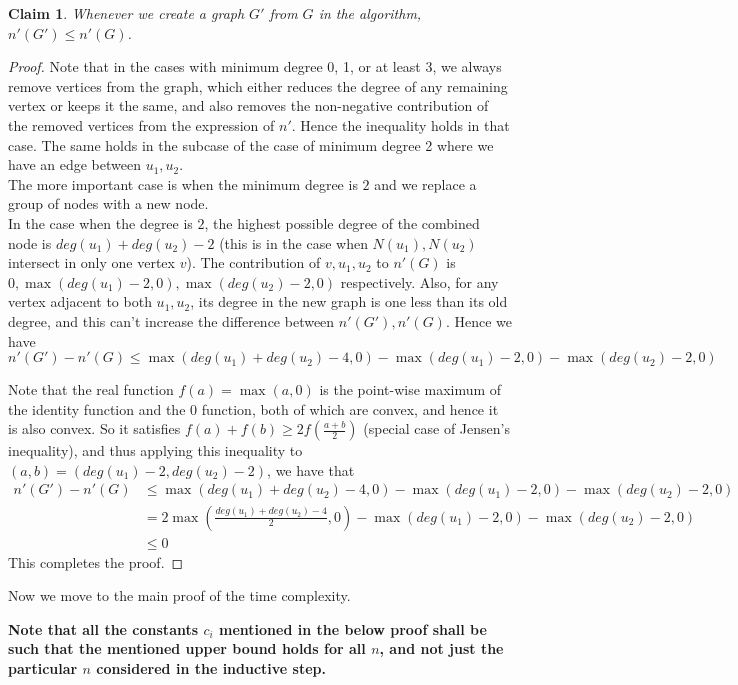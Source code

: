 \documentclass[answers]{exam}
\newtheorem{claim}{Claim}
\newcommand{\nl}{\vspace{0.2cm}\\}
\begin{document}
\begin{questions}
\begin{solution}
\begin{claim}
    Whenever we create a graph $G'$ from $G$ in the algorithm, $n'(G') \le n'(G)$.
\end{claim}
\begin{proof}
    Note that in the cases with minimum degree 0, 1, or at least 3, we always remove vertices from the graph, which either reduces the degree of any remaining vertex or keeps it the same, and also removes the non-negative contribution of the removed vertices from the expression of $n'$. Hence the inequality holds in that case. The same holds in the subcase of the case of minimum degree 2 where we have an edge between $u_1, u_2$.\nl
    The more important case is when the minimum degree is $2$ and we replace a group of nodes with a new node.\nl
    In the case when the degree is $2$, the highest possible degree of the combined node is $deg(u_1) + deg(u_2) - 2$ (this is in the case when $N(u_1), N(u_2)$ intersect in only one vertex $v$). The contribution of $v, u_1, u_2$ to $n'(G)$ is $0, \max(deg(u_1) - 2, 0), \max(deg(u_2) - 2, 0)$ respectively. Also, for any vertex adjacent to both $u_1, u_2$, its degree in the new graph is one less than its old degree, and this can't increase the difference between $n'(G'), n'(G)$. Hence we have 
    $$n'(G') - n'(G) \le \max(deg(u_1) + deg(u_2) - 4, 0) - \max(deg(u_1) - 2, 0) - \max(deg(u_2) - 2, 0)$$
    
    Note that the real function $f(a) = \max(a, 0)$ is the point-wise maximum of the identity function and the 0 function, both of which are convex, and hence it is also convex. So it satisfies $f(a) + f(b) \ge 2f\left(\frac{a + b}{2}\right)$ (special case of Jensen's inequality), and thus applying this inequality to $(a, b) = (deg(u_1) - 2, deg(u_2) - 2)$, we have that 
    \begin{align*}
        n'(G') - n'(G) &\le \max(deg(u_1) + deg(u_2) - 4, 0) - \max(deg(u_1) - 2, 0) - \max(deg(u_2) - 2, 0)\\
                       &= 2 \max\left(\frac{deg(u_1) + deg(u_2) - 4}{2}, 0\right) - \max(deg(u_1) - 2, 0) - \max(deg(u_2) - 2, 0)\\
                       &\le 0
    \end{align*}
    This completes the proof.
\end{proof}

Now we move to the main proof of the time complexity.

\textbf{Note that all the constants $c_i$ mentioned in the below proof shall be such that the mentioned upper bound holds for all $n$, and not just the particular $n$ considered in the
inductive step.}


\end{solution}
\end{questions}
\end{document}
